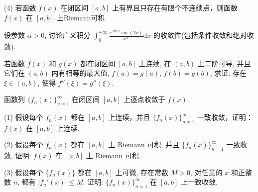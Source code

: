 (4) 若函数 $f(x)$ 在闭区间 $[a, b]$ 上有界且只存在有限个不连续点，则函数 $f(x)$ 在 $[a, b]$ 上Riemann可积.\par
\par{}
设参数 $\alpha > 0$, 讨论广义积分 $\int_{0}^{+\infty} \frac{e^{\sin x} \sin(2x)}{x^{\alpha}} \mathrm{d}x$ 的收敛性(包括条件收敛和绝对收敛).\par
\par{}
若函数 $f(x)$ 和 $g(x)$ 都在闭区间 $[a, b]$ 上连续, 在 $(a, b)$ 上二阶可导, 并且它们在 $(a, b)$ 内有相等的最大值, $f(a) = g(a)$, $f(b) = g(b)$, 求证: 存在 $\xi \in (a, b)$, 使得 $f''(\xi) = g''(\xi)$.\par
\par{}
函数列 $\{f_n(x)\}_{n=1}^{\infty}$ 在闭区间 $[a, b]$ 上逐点收敛于 $f(x)$.\par
(1) 假设每个 $f_{n}(x)$ 都在 $[a, b]$ 上连续，并且 $\{f_{n}(x)\}_{n=1}^{\infty}$ 一致收敛，证明：$f(x)$ 在 $[a, b]$ 上连续.\par
(2) 假设每个 $f_{n}(x)$ 都在 $[a, b]$ 上 Riemann 可积, 并且 $\{f_{n}(x)\}_{n=1}^{\infty}$ 一致收敛, 证明: $f(x)$ 在 $[a, b]$ 上 Riemann 可积.\par
(3) 假设每个 $\{f_n(x)\}$ 都在 $[a, b]$ 上可微, 存在常数 $M > 0$, 对任意的 $x$ 和正整数 $n$, 都有 $|f_n'(x)| \leq M$. 证明: $\{f_n(x)\}_{n=1}^{\infty}$ 在 $[a, b]$ 上一致收敛.\par
